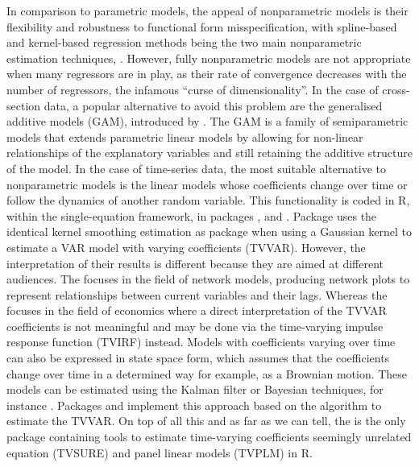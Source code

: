 In comparison to parametric models, the appeal of nonparametric models is their flexibility and robustness to functional form misspecification, with spline-based and kernel-based regression methods being the two main nonparametric estimation techniques, \citep[e.g.][]{Eubank1999}. However, fully nonparametric models are not appropriate when many regressors are in play, as their rate of convergence decreases with the number of regressors, the infamous ``curse of dimensionality''. In the case of cross-section data, a popular alternative to avoid this problem are the generalised additive models (GAM), introduced by \citet{HastieTibshirani1993}. The GAM is a family of semiparametric models that extends parametric linear models by allowing for non-linear relationships of the explanatory variables and still retaining the additive structure of the model. In the case of time-series data, the most suitable alternative to nonparametric models is the linear models whose coefficients change over time or follow the dynamics of another random variable. This functionality is coded in R, within the single-equation framework, in packages  \citep{mgm2016}, and  \citep{MARSS}. Package  uses the identical kernel smoothing estimation as package  when using a Gaussian kernel to estimate a VAR model with varying coefficients (TVVAR). However, the interpretation of their results is different because they are aimed at different audiences. The  focuses in the field of network models, producing network plots to represent relationships between current variables and their lags. Whereas the  focuses in the field of economics where a direct interpretation of the TVVAR coefficients is not meaningful and may be done via the time-varying impulse response function (TVIRF) instead. Models with coefficients varying over time can also be expressed in state space form, which assumes that the coefficients change over time in a determined way for example, as a Brownian motion. These models can be estimated using the Kalman filter or Bayesian techniques, for instance \citep{LiuGuo2019, Primiceri2005}. Packages  and  \citep{bvarsv} implement this approach based on the \citet{CarterKohn1994} algorithm to estimate the TVVAR. On top of all this and as far as we can tell, the  is the only package containing tools to estimate time-varying coefficients seemingly unrelated equation (TVSURE) and panel linear models (TVPLM) in R. 

